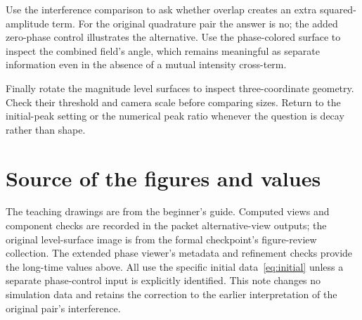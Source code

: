 \documentclass[10pt]{article}
\begin{document}
Use the interference comparison to ask whether overlap creates an extra squared-amplitude term. For the original quadrature pair the answer is no; the added zero-phase control illustrates the alternative. Use the phase-colored surface to inspect the combined field's angle, which remains meaningful as separate information even in the absence of a mutual intensity cross-term.

Finally rotate the magnitude level surfaces to inspect three-coordinate geometry. Check their threshold and camera scale before comparing sizes. Return to the initial-peak setting or the numerical peak ratio whenever the question is decay rather than shape.

\section*{Source of the figures and values}
The teaching drawings are from the beginner's guide. Computed views and component checks are recorded in the packet alternative-view outputs; the original level-surface image is from the formal checkpoint's figure-review collection. The extended phase viewer's metadata and refinement checks provide the long-time values above. All use the specific initial data~\eqref{eq:initial} unless a separate phase-control input is explicitly identified. This note changes no simulation data and retains the correction to the earlier interpretation of the original pair's interference.
\end{document}
